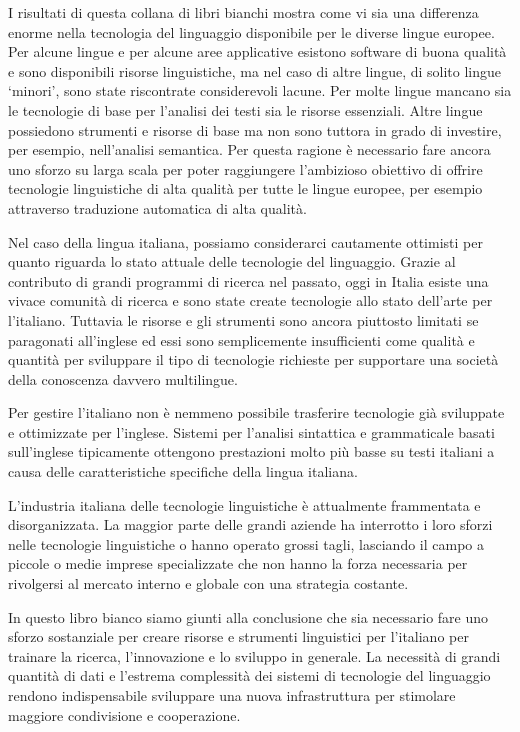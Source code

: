 \documentclass[]{../../metanetpaper}
\begin{document}
\begin{multicols}{2}
I risultati di questa collana di libri bianchi mostra come vi sia una differenza enorme nella tecnologia del  linguaggio disponibile per le diverse lingue europee. Per alcune lingue e per alcune aree applicative esistono software di buona qualit\`{a} e sono disponibili risorse linguistiche, ma nel caso di altre lingue, di solito lingue `minori', sono state riscontrate considerevoli lacune. Per molte lingue mancano sia le tecnologie di base per l'analisi dei testi sia le risorse essenziali. Altre lingue possiedono strumenti e risorse di base ma non sono tuttora in grado di investire, per esempio, nell'analisi semantica. Per questa ragione \`{e} necessario fare ancora uno sforzo su larga scala per poter raggiungere l'ambizioso obiettivo di offrire tecnologie linguistiche di alta qualit\`{a} per tutte le lingue europee, per esempio attraverso traduzione automatica di alta qualit\`{a}.

Nel caso della lingua italiana, possiamo considerarci cautamente ottimisti per
quanto riguarda lo stato attuale delle tecnologie del linguaggio. Grazie al
contributo di grandi programmi di ricerca nel passato, oggi in Italia esiste
una vivace comunit\`{a} di ricerca e sono state create tecnologie allo stato
dell'arte per l'italiano. Tuttavia le risorse e gli strumenti sono ancora
piuttosto limitati se paragonati all'inglese ed essi sono semplicemente
insufficienti come qualit\`{a} e quantit\`{a} per sviluppare il tipo di
tecnologie richieste per supportare una societ\`{a} della conoscenza davvero
multilingue.

Per gestire l'italiano non \`{e} nemmeno possibile trasferire tecnologie
gi\`{a} sviluppate e ottimizzate per l'inglese. Sistemi per l'analisi
sintattica e grammaticale basati sull'inglese tipicamente ottengono
prestazioni molto pi\`{u} basse su testi italiani a causa delle
caratteristiche specifiche della lingua italiana.

L'industria italiana delle tecnologie linguistiche \`{e} attualmente
frammentata e disorganizzata. La maggior parte delle grandi aziende ha
interrotto i loro sforzi nelle tecnologie linguistiche o hanno operato grossi
tagli, lasciando il campo a piccole o medie imprese specializzate che non
hanno la forza necessaria per rivolgersi al mercato interno e globale con una
strategia costante. 

In questo libro bianco siamo giunti alla conclusione che sia necessario fare
uno sforzo sostanziale per creare risorse e strumenti linguistici per l'italiano per trainare la
ricerca, l'innovazione e lo sviluppo in generale. La necessit\`{a} di grandi
quantit\`{a} di dati e l'estrema complessit\`{a} dei sistemi di tecnologie del
linguaggio rendono
indispensabile sviluppare una nuova infrastruttura per stimolare maggiore
condivisione e cooperazione. 


\end{multicols}
\end{document}
